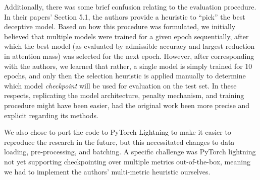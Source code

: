 Additionally, there was some brief confusion relating to the evaluation procedure. In their papers' Section 5.1, the authors provide a heuristic to ``pick'' the best deceptive model. Based on how this procedure was formulated, we initially believed that multiple models were trained for a given epoch sequentially, after which the best model (as evaluated by admissible accuracy and largest reduction in attention mass) was selected for the next epoch. However, after corresponding with the authors, we learned that rather, a single model is simply trained for 10 epochs, and only then the selection heuristic is applied manually to determine which model \textit{checkpoint} will be used for evaluation on the test set. In these respects, replicating the model architecture, penalty mechanism, and training procedure might have been easier, had the original work been more precise and explicit regarding its methods.

We also chose to port the code to PyTorch Lightning to make it easier to reproduce the research in the future, but this necessitated changes to data loading, pre-processing, and batching. A specific challenge was PyTorch lightning not yet supporting checkpointing over multiple metrics out-of-the-box, meaning we had to implement the authors' multi-metric heuristic ourselves.

